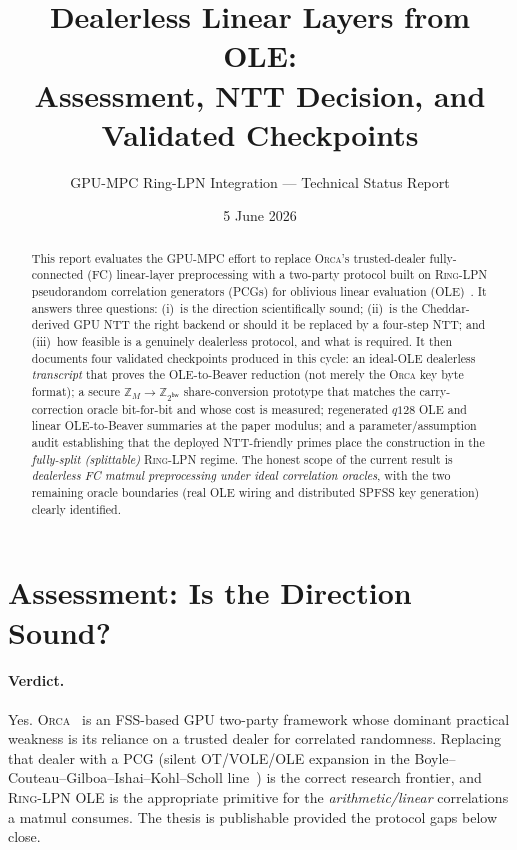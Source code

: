 \documentclass[11pt]{article}
\title{Dealerless \Orca{} Linear Layers from \RingLPN{} OLE:\\
Assessment, NTT Decision, and Validated Checkpoints}
\author{GPU-MPC Ring-LPN Integration --- Technical Status Report}
\date{5 June 2026}
\newcommand{\Z}{\mathbb{Z}}
\newcommand{\modtwo}{\Z_{2^{\mathsf{bw}}}}
\newcommand{\Orca}{\textsc{Orca}}
\newcommand{\RingLPN}{\textsc{Ring-LPN}}
\begin{document}
\maketitle

\begin{abstract}
This report evaluates the GPU-MPC effort to replace \Orca{}'s trusted-dealer
fully-connected (FC) linear-layer preprocessing with a two-party protocol built
on \RingLPN{} pseudorandom correlation generators (PCGs) for oblivious linear
evaluation (OLE)~\cite{boyle2022ringlpn}. It answers three questions: (i)~is the
direction scientifically sound; (ii)~is the Cheddar-derived GPU NTT the right
backend or should it be replaced by a four-step NTT; and (iii)~how feasible is a
genuinely dealerless protocol, and what is required. It then documents four
validated checkpoints produced in this cycle: an ideal-OLE dealerless
\emph{transcript} that proves the OLE-to-Beaver reduction (not merely the
\Orca{} key byte format); a secure $\Z_M\!\to\!\modtwo$ share-conversion
prototype that matches the carry-correction oracle bit-for-bit and whose cost is
measured; regenerated $q128$ OLE and linear OLE-to-Beaver summaries at the
paper modulus; and a parameter/assumption audit establishing that the deployed
NTT-friendly primes place the construction in the \emph{fully-split (splittable)}
\RingLPN{} regime. The honest scope of the current result is
\emph{dealerless FC matmul preprocessing under ideal correlation oracles}, with
the two remaining oracle boundaries (real OLE wiring and distributed SPFSS
key generation) clearly identified.
\end{abstract}

\tableofcontents

\section{Assessment: Is the Direction Sound?}

\paragraph{Verdict.} Yes. \Orca{}~\cite{jawalkar2024orca} is an FSS-based GPU
two-party framework whose dominant practical weakness is its reliance on a
trusted dealer for correlated randomness. Replacing that dealer with a PCG
(silent OT/VOLE/OLE expansion in the Boyle--Couteau--Gilboa--Ishai--Kohl--Scholl
line~\cite{boyle2019pcg,boyle2022ringlpn}) is the correct research frontier, and
\RingLPN{} OLE is the appropriate primitive for the \emph{arithmetic/linear}
correlations a matmul consumes. The thesis is publishable provided the protocol
gaps below close.
\end{document}
